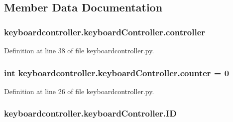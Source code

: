 \subsection{Member Data Documentation}
\hypertarget{classkeyboardcontroller_1_1keyboardController_acedfc069a10168dd3e8de172dcc4f817}{
\subsubsection[{controller}]{\setlength{\rightskip}{0pt plus 5cm}keyboardcontroller.\-keyboard\-Controller.\-controller}}\label{classkeyboardcontroller_1_1keyboardController_acedfc069a10168dd3e8de172dcc4f817}


Definition at line 38 of file keyboardcontroller.\-py.

\hypertarget{classkeyboardcontroller_1_1keyboardController_a7a5f1772528a0380ca4df4469073d747}{
\subsubsection[{counter}]{\setlength{\rightskip}{0pt plus 5cm}int keyboardcontroller.\-keyboard\-Controller.\-counter = 0\hspace{0.3cm}{\ttfamily [static]}}}\label{classkeyboardcontroller_1_1keyboardController_a7a5f1772528a0380ca4df4469073d747}


Definition at line 26 of file keyboardcontroller.\-py.

\hypertarget{classkeyboardcontroller_1_1keyboardController_a8668e027600858b08be3135edc5f334a}{
\subsubsection[{I\-D}]{\setlength{\rightskip}{0pt plus 5cm}keyboardcontroller.\-keyboard\-Controller.\-I\-D}}\label{classkeyboardcontroller_1_1keyboardController_a8668e027600858b08be3135edc5f334a}


